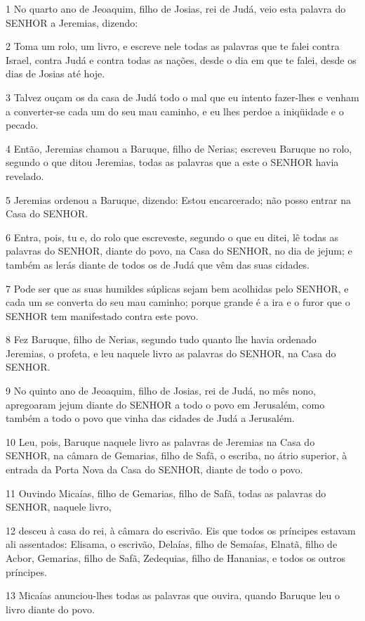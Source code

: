 \par 1 No quarto ano de Jeoaquim, filho de Josias, rei de Judá, veio esta palavra do SENHOR a Jeremias, dizendo:
\par 2 Toma um rolo, um livro, e escreve nele todas as palavras que te falei contra Israel, contra Judá e contra todas as nações, desde o dia em que te falei, desde os dias de Josias até hoje.
\par 3 Talvez ouçam os da casa de Judá todo o mal que eu intento fazer-lhes e venham a converter-se cada um do seu mau caminho, e eu lhes perdoe a iniqüidade e o pecado.
\par 4 Então, Jeremias chamou a Baruque, filho de Nerias; escreveu Baruque no rolo, segundo o que ditou Jeremias, todas as palavras que a este o SENHOR havia revelado.
\par 5 Jeremias ordenou a Baruque, dizendo: Estou encarcerado; não posso entrar na Casa do SENHOR.
\par 6 Entra, pois, tu e, do rolo que escreveste, segundo o que eu ditei, lê todas as palavras do SENHOR, diante do povo, na Casa do SENHOR, no dia de jejum; e também as lerás diante de todos os de Judá que vêm das suas cidades.
\par 7 Pode ser que as suas humildes súplicas sejam bem acolhidas pelo SENHOR, e cada um se converta do seu mau caminho; porque grande é a ira e o furor que o SENHOR tem manifestado contra este povo.
\par 8 Fez Baruque, filho de Nerias, segundo tudo quanto lhe havia ordenado Jeremias, o profeta, e leu naquele livro as palavras do SENHOR, na Casa do SENHOR.
\par 9 No quinto ano de Jeoaquim, filho de Josias, rei de Judá, no mês nono, apregoaram jejum diante do SENHOR a todo o povo em Jerusalém, como também a todo o povo que vinha das cidades de Judá a Jerusalém.
\par 10 Leu, pois, Baruque naquele livro as palavras de Jeremias na Casa do SENHOR, na câmara de Gemarias, filho de Safã, o escriba, no átrio superior, à entrada da Porta Nova da Casa do SENHOR, diante de todo o povo.
\par 11 Ouvindo Micaías, filho de Gemarias, filho de Safã, todas as palavras do SENHOR, naquele livro,
\par 12 desceu à casa do rei, à câmara do escrivão. Eis que todos os príncipes estavam ali assentados: Elisama, o escrivão, Delaías, filho de Semaías, Elnatã, filho de Acbor, Gemarias, filho de Safã, Zedequias, filho de Hananias, e todos os outros príncipes.
\par 13 Micaías anunciou-lhes todas as palavras que ouvira, quando Baruque leu o livro diante do povo.
